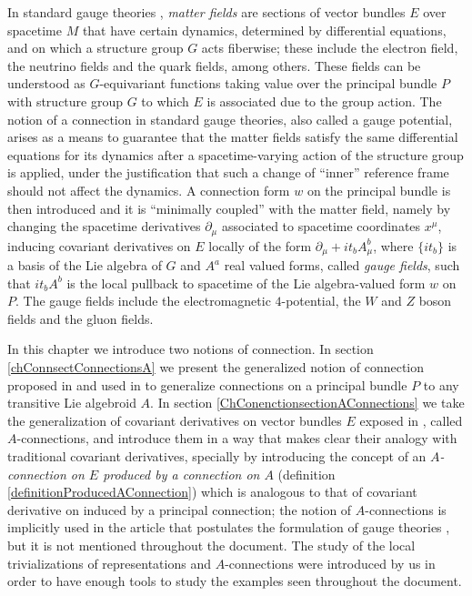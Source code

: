             
    


In standard gauge theories \cite{Bleecker1982, Naber, NaberInteractions}, \textit{matter fields} are sections of vector bundles $E$ over spacetime $M$ that have certain dynamics, determined by differential equations, and on which a structure group $G$ acts fiberwise; these include the electron field, the neutrino fields and the quark fields, among others. These fields can be understood as $G$-equivariant functions taking value over the principal bundle $P$ with structure group $G$ to which $E$ is associated due to the group action. The notion of a connection in standard gauge theories, also called a gauge potential, arises as a means to guarantee that the matter fields satisfy the same differential equations for its dynamics after a spacetime-varying action of the structure group is applied, under the justification that such a change of ``inner'' reference frame should not affect the dynamics. A connection form $w$ on the principal bundle is then introduced and it is ``minimally coupled'' with the matter field, namely by changing the spacetime derivatives $\partial_\mu$ associated to spacetime coordinates $x^\mu$, inducing covariant derivatives on $E$ locally of the form $\partial_\mu + it_bA_\mu^b$, where $\{it_b\}$ is a basis of the Lie algebra of $G$ and $A^a$ real valued forms, called \textit{gauge fields}, such that $it_bA^b$ is the local pullback to spacetime of the Lie algebra-valued form $w$ on $P$. The gauge fields include the electromagnetic $4$-potential, the $W$ and $Z$ boson fields and the gluon fields.

In this chapter we introduce two notions of connection. In section \ref{chConnsectConnectionsA} we present the generalized notion of connection proposed in \cite{Lazzarini2012} and used in \cite{Fournel2013} to generalize connections on a principal bundle $P$ to any transitive Lie algebroid $A$. In section \ref{ChConenctionsectionAConnections} we take the generalization of covariant derivatives on vector bundles $E$ exposed in \cite{Lazzarini2012}, called $A$-connections, and introduce them in a way that makes clear their analogy with traditional covariant derivatives, specially by introducing the concept of an \textit{$A$-connection on $E$ produced by a connection on $A$} (definition \ref{definitionProducedAConnection}) which is analogous to that of covariant derivative on induced by a principal connection; the notion of $A$-connections is implicitly used in the article that postulates the formulation of gauge theories \cite{Fournel2013}, but it is not mentioned throughout the document. The study of the local trivializations of representations and $A$-connections were introduced by us in order to have enough tools to study the examples seen throughout the document.


